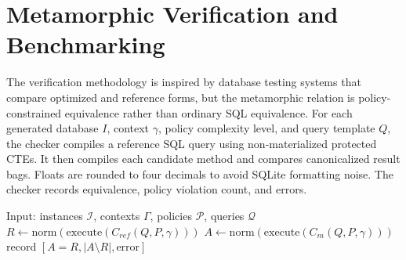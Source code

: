 \documentclass[conference]{IEEEtran}
\newcommand{\ctx}{\gamma}
\begin{document}
\section{Metamorphic Verification and Benchmarking}
\label{sec:testing}

The verification methodology is inspired by database testing systems that compare optimized and reference forms\cite{rigger2020pqs,rigger2020norec,rigger2020tlp,ba2023qpg,ba2024dqp}, but the metamorphic relation is policy-constrained equivalence rather than ordinary SQL equivalence. For each generated database $I$, context $\ctx$, policy complexity level, and query template $Q$, the checker compiles a reference SQL query using non-materialized protected CTEs. It then compiles each candidate method and compares canonicalized result bags. Floats are rounded to four decimals to avoid SQLite formatting noise. The checker records equivalence, policy violation count, and errors.

\begin{algorithm}[t]
\caption{Metamorphic policy-equivalence checking}
\label{alg:check}
\begin{algorithmic}[1]
\STATE Input: instances $\mathcal{I}$, contexts $\Gamma$, policies $\mathcal{P}$, queries $\mathcal{Q}$
\FOR{$I\in\mathcal{I}$, $\ctx\in\Gamma$, $P\in\mathcal{P}$, $Q\in\mathcal{Q}$}
  \STATE $R \leftarrow \mathrm{norm}(\mathrm{execute}(C_{ref}(Q,P,\ctx)))$
    \STATE $A \leftarrow \mathrm{norm}(\mathrm{execute}(C_m(Q,P,\ctx)))$
    \STATE record $[A=R, |A\setminus R|, \mathrm{error}]$
  \ENDFOR
\ENDFOR
\end{algorithmic}
\end{algorithm}
\end{document}
